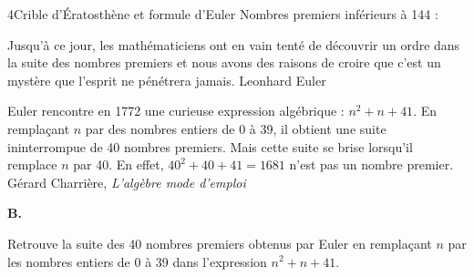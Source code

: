 \begin{exercice}{4}{Crible d'Ératosthène et formule d'Euler}
\vspace{20pt}
Nombres premiers inférieurs à 144 : 

\vspace{20pt}
{\footnotesize \og Jusqu'à ce jour, les mathématiciens ont en vain tenté de découvrir un ordre dans la suite des nombres premiers et nous avons des raisons de croire que c'est un mystère que l'esprit ne pénétrera jamais. \fg \hfill Leonhard Euler}

\medskip
{\footnotesize \og Euler rencontre en 1772 une curieuse expression algébrique : $n^2 + n + 41$. En remplaçant $n$ par des nombres entiers de 0 à 39, il obtient une suite ininterrompue de 40 nombres premiers. Mais cette suite se brise lorsqu'il remplace $n$ par 40. En effet, $40^2 + 40 + 41 = 1681$ n'est pas un nombre premier. \fg \hfill Gérard Charrière, \textit{L'algèbre mode d'emploi}}

\newpage
\textbf{B.}

\medskip
Retrouve la suite des 40 nombres premiers obtenus par Euler en remplaçant $n$ par les nombres entiers de 0 à 39 dans l'expression $n^2 + n + 41$.


\end{exercice}
